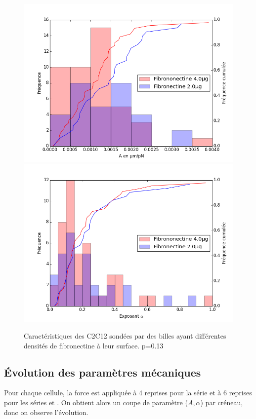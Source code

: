 \documentclass{report}
\begin{document}
\begin{figure}
\includegraphics[scale=0.5]{Figures/A_coating.png} 
\includegraphics[scale=0.5]{Figures/E_coating.png} 
\caption{Caractéristiques des C2C12 sondées par des billes ayant différentes densités de fibronectine à leur surface. p=0.13}
\end{figure}

\subsection{\'Evolution des paramètres mécaniques}

Pour chaque cellule, la force est appliquée à 4 reprises pour la série  et à 6 reprises pour les séries  et . On obtient alors un coupe de paramètre ($A,\alpha$) par créneau, donc on observe l'évolution. 
\end{document}

